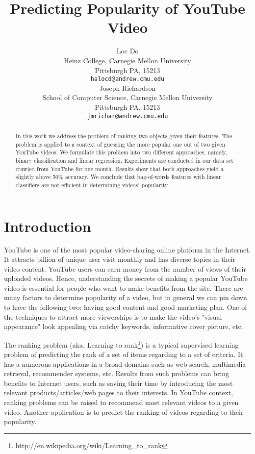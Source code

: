 \documentclass{article} %
\title{Predicting Popularity of YouTube Video}
\author{
Loc Do \\
Heinz College,
Carnegie Mellon University \\
Pittsburgh PA, 15213\\
\texttt{halocd@andrew.cmu.edu} \\
\And
Joseph Richardson \\
School of Computer Science,
Carnegie Mellon University \\
Pittsburgh PA, 15213 \\
\texttt{jmrichar@andrew.cmu.edu} \\
}
\begin{document}
\maketitle

\begin{abstract}
	In this work we address the problem of ranking two objects given their features. The problem is applied to a context of guessing the more popular one out of two given YouTube videos. We formulate this problem into two different approaches, namely, binary classification and linear regression. Experiments are conducted in our data set crawled from YouTube for one month. Results show that both approaches yield a slightly above 50\% accuracy. We conclude that bag-of-words features with linear classifiers are not efficient in determining videos' popularity.
\end{abstract}

\section{Introduction}
\label{sec:intro}
	YouTube is one of the most popular video-sharing online platform in the Internet. It attracts billion of unique user visit monthly and has diverse topics in their video content. YouTube users can earn money from the number of views of their uploaded videos. Hence, understanding the secrets of making a popular YouTube video is essential for people who want to make benefits from the site. There are many factors to determine popularity of a video, but in general we can pin down to have the following two: having good content and good marketing plan. One of the techniques to attract more viewerships is to make the video's "visual appearance" look appealing via catchy keywords, informative cover picture, etc.

	The ranking problem (aka. Learning to rank\footnote{http://en.wikipedia.org/wiki/Learning\_to\_rank}) is a typical supervised learning problem of predicting the rank of a set of items regarding to a set of criteria. It has a numerous applications in a broad domains such as web search, multimedia retrieval, recommender systems, etc. Results from such problems can bring benefits to Internet users, such as saving their time by introducing the most relevant products/articles/web pages to their interests. In YouTube context, ranking problems can be raised to recommend most relevant videos to a given video. Another application is to predict the ranking of videos regarding to their popularity.
\end{document}
